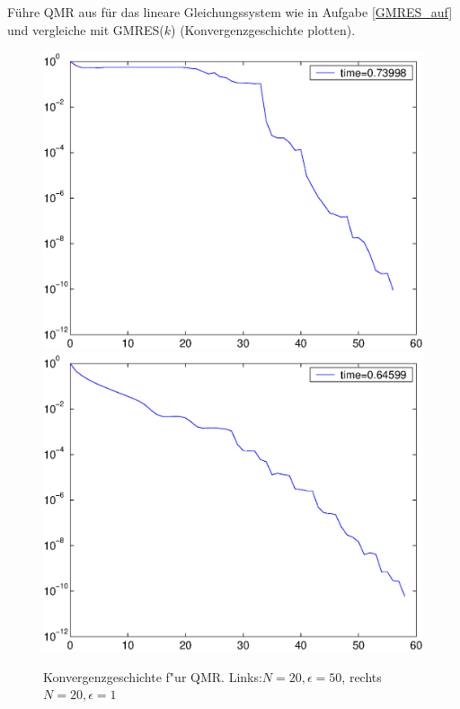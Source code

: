 \begin{aufg}
F\"uhre QMR aus f\"ur das lineare Gleichungssystem wie in Aufgabe \ref{GMRES_auf} und vergleiche mit
GMRES($k$) (Konvergenzgeschichte plotten).
\end{aufg}
\begin{figure}[h!]
\includegraphics[scale=0.35]{eps/mp3qmrN20e50.eps}\hfill\includegraphics[scale=0.35]{eps/mp3qmrN20e1.eps}
\caption{Konvergenzgeschichte f"ur QMR. Links:$N=20, \epsilon = 50$, rechts $N=20, \epsilon = 1$}
\end{figure}

